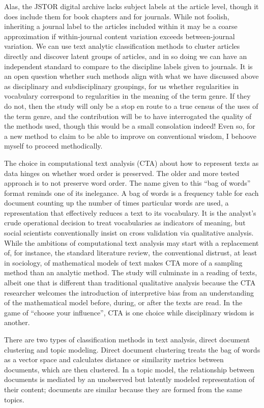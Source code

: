 \documentclass[]{book}
\theoremstyle{definition}
\theoremstyle{definition}
\theoremstyle{definition}
\theoremstyle{remark}
\begin{document}
Alas, the JSTOR digital archive lacks subject labels at the article
level, though it does include them for book chapters and for journals.
While not foolish, inheriting a journal label to the articles included
within it may be a coarse approximation if within-journal content
variation exceeds between-journal variation. We can use text analytic
classification methods to cluster articles directly and discover latent
groups of articles, and in so doing we can have an independent standard
to compare to the discipline labels given to journals. It is an open
question whether such methods align with what we have discussed above as
disciplinary and subdisciplinary groupings, for us whether regularities
in vocabulary correspond to regularities in the meaning of the term
genre. If they do not, then the study will only be a stop en route to a
true census of the uses of the term genre, and the contribution will be
to have interrogated the quality of the methods used, though this would
be a small consolation indeed! Even so, for a new method to claim to be
able to improve on conventional wisdom, I behoove myself to proceed
methodically.

The choice in computational text analysis (CTA) about how to represent
texts as data hinges on whether word order is preserved. The older and
more tested approach is to not preserve word order. The name given to
this ``bag of words'' format reminds one of its inelegance. A bag of
words is a frequency table for each document counting up the number of
times particular words are used, a representation that effectively
reduces a text to its vocabulary. It is the analyst's crude operational
decision to treat vocabularies as indicators of meaning, but social
scientists conventionally insist on cross validation via qualitative
analysis. While the ambitions of computational text analysis may start
with a replacement of, for instance, the standard literature review, the
conventional distrust, at least in sociology, of mathematical models of
text makes CTA more of a sampling method than an analytic method. The
study will culminate in a reading of texts, albeit one that is different
than traditional qualitative analysis because the CTA researcher
welcomes the introduction of interpretive bias from an understanding of
the mathematical model before, during, or after the texts are read. In
the game of ``choose your influence'', CTA is one choice while
disciplinary wisdom is another.

There are two types of classification methods in text analysis, direct
document clustering and topic modeling. Direct document clustering
treats the bag of words as a vector space and calculates distance or
similarity metrics between documents, which are then clustered. In a
topic model, the relationship between documents is mediated by an
unobserved but latently modeled representation of their content;
documents are similar because they are formed from the same topics.
\end{document}

